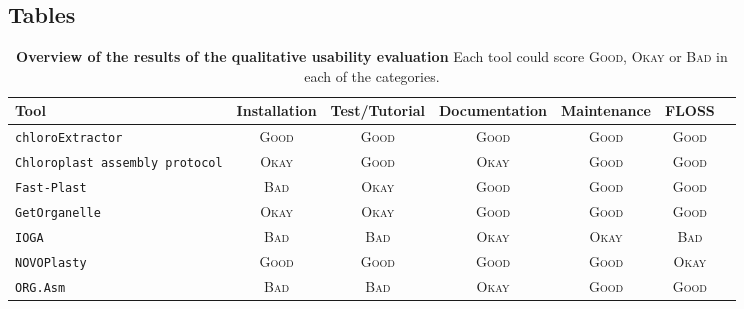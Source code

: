 \documentclass{bmcart}
\newcommand{\formatprogramnames}[1]{\texttt{#1}}
\newcommand{\ce}{\formatprogramnames{chloroExtractor}}
\newcommand{\oa}{\formatprogramnames{ORG.Asm}}
\newcommand{\fp}{\formatprogramnames{Fast-Plast}}
\newcommand{\ioga}{\formatprogramnames{IOGA}}
\newcommand{\np}{\formatprogramnames{NOVOPlasty}}
\newcommand{\go}{\formatprogramnames{GetOrganelle}}
\newcommand{\cassp}{\formatprogramnames{Chloroplast assembly protocol}}
\newcommand{\ok}{\textsc{Okay}}
\newcommand{\bad}{\textsc{Bad}}
\newcommand{\good}{\textsc{Good}}
\begin{document}
\begin{backmatter}

\section*{Tables}
\begin{table}[h!]
    \centering
    \caption{\textbf{Overview of the results of the qualitative usability evaluation} Each tool 
    could score \good{}, \ok{} or \bad{} in each of the categories.}
    \label{tab:resultsQual}
\begin{tabular}{p{3cm}cccccc}   
Tool & Installation & Test/Tutorial & Documentation & Maintenance & FLOSS\\                           \hline \ce{}     &  \good{}  &  \good{}  &  \good{}  &  \good{}  &  \good{} \\
\cassp{}  &  \ok{}    &  \good{}  &  \ok{}    &  \good{}  &  \good{} \\
\fp{}     &  \bad{}   &  \ok{}    &  \good{}  &  \good{}  &  \good{} \\
\go{}     &  \ok{}    &  \ok{}    &  \good{}  &  \good{}  &  \good{} \\
\ioga{}   &  \bad{}   &  \bad{}   &  \ok{}    &  \ok{}    &  \bad{}  \\
\np{}     &  \good{}  &  \good{}  &  \good{}  &  \good{}  &  \ok{}   \\
\oa{}     &  \bad{}   &  \bad{}   &  \ok{}    &  \good{}  &  \good{} \\ \hline
\end{tabular}      
\end{table}


\end{backmatter}
\end{document}

